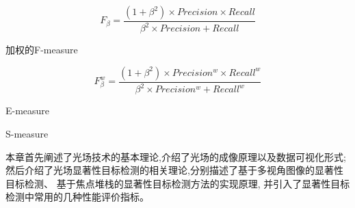 \begin{equation}
	F_{\beta} = \frac{\left ( 1 + \beta^{2} \right ) \times Precision \times Recall }{\beta^{2} \times Precision + Recall } 
\end{equation}

加权的F-measure\par

\begin{equation}
	F_{\beta}^{w} = \frac{\left ( 1 + \beta^{2} \right ) \times Precision^{w}  \times Recall^{w} }{\beta^{2} \times Precision^{w} + Recall^{w} } 
\end{equation}

E-measure\par
S-measure\par





本章首先阐述了光场技术的基本理论,介绍了光场的成像原理以及数据可视化形式;
然后介绍了光场显著性目标检测的相关理论,分别描述了基于多视角图像的显著性目标检测、
基于焦点堆栈的显著性目标检测方法的实现原理,
并引入了显著性目标检测中常用的几种性能评价指标。